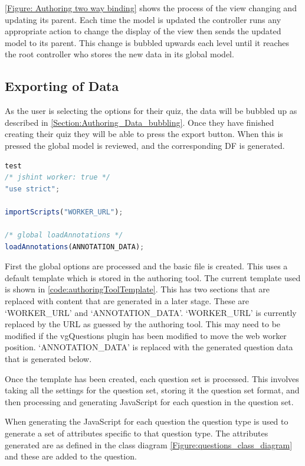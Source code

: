 \autoref{Figure: Authoring two way binding} shows the process of the view changing and updating its parent. Each time the model is updated the controller runs any appropriate action to change the display of the view then sends the updated model to its parent. This change is bubbled upwards each level until it reaches the root controller who stores the new data in its global model.

\subsection{Exporting of Data}
\label{Section:Authoring_export_data}

As the user is selecting the options for their quiz, the data will be bubbled up as described in \autoref{Section:Authoring_Data_bubbling}. Once they have finished creating their quiz they will be able to press the export button. When this is pressed the global model is reviewed, and the corresponding \gls{DF} is generated.
\begin{lstlisting}[language=javascript,caption={Base template for authoring tool \gls{DF} generation},label={code:authoringToolTemplate} ]
test
/* jshint worker: true */
"use strict";

importScripts("WORKER_URL");

/* global loadAnnotations */
loadAnnotations(ANNOTATION_DATA);
\end{lstlisting}

First the global options are processed and the basic file is created. This uses a default template which is stored in the authoring tool. The current template used is shown in \autoref{code:authoringToolTemplate}. This has two sections that are replaced with content that are generated in a later stage. These are `WORKER\_URL' and `ANNOTATION\_DATA'. `WORKER\_URL' is currently replaced by the URL as guessed by the authoring tool. This may need to be modified if the vgQuestions plugin has been modified to move the web worker position. `ANNOTATION\_DATA' is replaced with the generated question data that is generated below.

Once the template has been created, each question set is processed. This involves taking all the settings for the question set, storing it the question set format, and then processing and generating JavaScript for each question in the question set.

When generating the JavaScript for each question the question type is used to generate a set of attributes specific to that question type. The attributes generated are as defined in the class diagram \autoref{Figure:questions_class_diagram} and these are added to the question.

